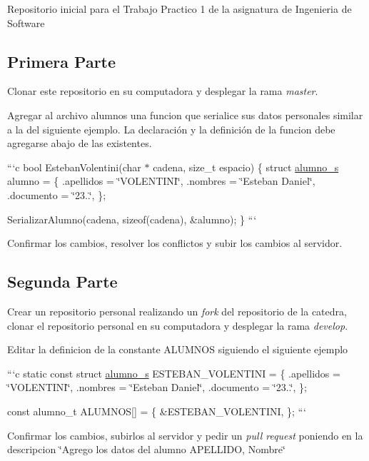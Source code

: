 Repositorio inicial para el Trabajo Practico 1 de la asignatura de Ingenieria de Software

\subsection*{Primera Parte}


\begin{DoxyEnumerate}
\item Clonar este repositorio en su computadora y desplegar la rama {\itshape master}.
\item Agregar al archivo alumnos una funcion que serialice sus datos personales similar a la del siguiente ejemplo. La declaración y la definición de la funcion debe agregarse abajo de las existentes.

```c bool Esteban\+Volentini(char $\ast$ cadena, size\+\_\+t espacio) \{ struct \hyperlink{structalumno__s}{alumno\+\_\+s} alumno = \{ .apellidos = \char`\"{}\+V\+O\+L\+E\+N\+T\+I\+N\+I\char`\"{}, .nombres = \char`\"{}\+Esteban Daniel\char`\"{}, .documento = \char`\"{}23..\char`\"{}, \};

Serializar\+Alumno(cadena, sizeof(cadena), \&alumno); \} ```
\item Confirmar los cambios, resolver los conflictos y subir los cambios al servidor.
\end{DoxyEnumerate}

\subsection*{Segunda Parte}


\begin{DoxyEnumerate}
\item Crear un repositorio personal realizando un {\itshape fork} del repositorio de la catedra, clonar el repositorio personal en su computadora y desplegar la rama {\itshape develop}.
\item Editar la definicion de la constante A\+L\+U\+M\+N\+OS siguiendo el siguiente ejemplo

```c static const struct \hyperlink{structalumno__s}{alumno\+\_\+s} E\+S\+T\+E\+B\+A\+N\+\_\+\+V\+O\+L\+E\+N\+T\+I\+NI = \{ .apellidos = \char`\"{}\+V\+O\+L\+E\+N\+T\+I\+N\+I\char`\"{}, .nombres = \char`\"{}\+Esteban Daniel\char`\"{}, .documento = \char`\"{}23..\char`\"{}, \};

const alumno\+\_\+t A\+L\+U\+M\+N\+OS\mbox{[}\mbox{]} = \{ \&E\+S\+T\+E\+B\+A\+N\+\_\+\+V\+O\+L\+E\+N\+T\+I\+NI, \}; ```
\item Confirmar los cambios, subirlos al servidor y pedir un {\itshape pull request} poniendo en la descripcion \char`\"{}\+Agrego los datos del alumno A\+P\+E\+L\+L\+I\+D\+O, Nombre\char`\"{}
\end{DoxyEnumerate}

